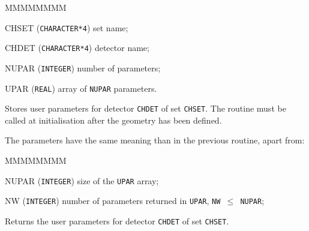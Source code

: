               
              

\begin{DLtt}{MMMMMMMM}
\item[CHSET] ({\tt CHARACTER*4}) set name;
\item[CHDET] ({\tt CHARACTER*4}) detector name;
\item[NUPAR] ({\tt INTEGER}) number of parameters;
\item[UPAR] ({\tt REAL}) array of {\tt NUPAR} parameters.
\end{DLtt}
Stores user parameters for detector {\tt CHDET} of set {\tt CHSET}.
The routine must be called at initialisation after the geometry has
been defined.

The parameters have the same meaning than in the previous routine, 
apart from:
\begin{DLtt}{MMMMMMMM}
\item[NUPAR] ({\tt INTEGER}) size of the {\tt UPAR} array;
\item[NW] ({\tt INTEGER}) number of parameters returned in {\tt UPAR},
{\tt NW $\leq$ NUPAR};
\end{DLtt}

Returns the user parameters for detector {\tt CHDET} of set {\tt CHSET}.
